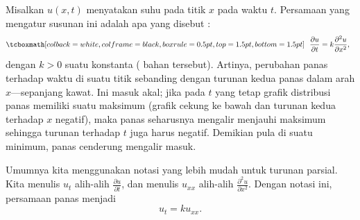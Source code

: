 Misalkan $u(x,t)$ menyatakan suhu pada titik $x$ pada waktu $t$.
Persamaan yang mengatur susunan ini adalah
apa yang disebut \emph{}:
\begin{equation*}
\mybxbg{~~
\frac{\partial u}{\partial t} =
k \frac{\partial^2 u}{\partial x^2} ,
~~}
\end{equation*}
dengan $k > 0$ suatu konstanta (\emph{} bahan tersebut).
Artinya, perubahan panas terhadap waktu di suatu titik
sebanding dengan turunan kedua
panas dalam arah $x$---sepanjang kawat.
Ini masuk akal;
jika pada $t$ yang tetap
grafik distribusi panas memiliki suatu maksimum
(grafik cekung ke bawah dan turunan kedua terhadap $x$ negatif),
maka panas seharusnya mengalir menjauhi maksimum sehingga turunan terhadap $t$ juga
harus negatif.
Demikian pula di suatu minimum, panas cenderung mengalir masuk.

Umumnya kita menggunakan notasi yang lebih mudah untuk turunan parsial.
Kita menulis $u_t$ alih-alih $\frac{\partial u}{\partial t}$,
dan menulis $u_{xx}$ alih-alih $\frac{\partial^2 u}{\partial x^2}$.
Dengan notasi ini, persamaan panas menjadi
\begin{equation*}
u_t = k u_{xx} .
\end{equation*}

